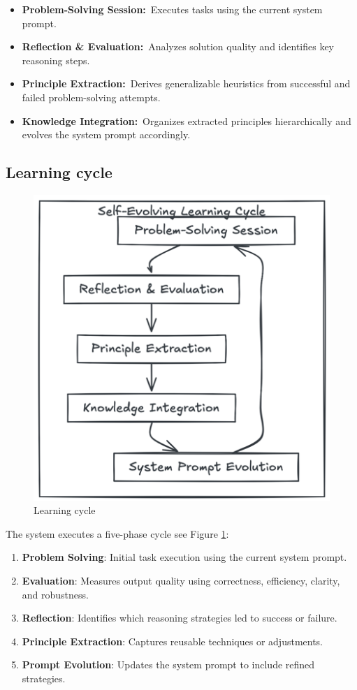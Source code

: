 \documentclass[10pt,a4paper,twocolumn]{article}
\begin{document}
\begin{itemize}
    \item \textbf{Problem-Solving Session:} Executes tasks using the current system prompt.
    \item \textbf{Reflection \& Evaluation:} Analyzes solution quality and identifies key reasoning steps.
    \item \textbf{Principle Extraction:} Derives generalizable heuristics from successful and failed problem-solving attempts.
    \item \textbf{Knowledge Integration:} Organizes extracted principles hierarchically and evolves the system prompt accordingly.
\end{itemize}



\subsection{Learning cycle}

\begin{figure}
    \centering
    \includegraphics[width=0.75\linewidth]{learning_cycle.png}
    \caption{Learning cycle}
    \label{fig:cycle}
\end{figure}


 The system executes a five-phase cycle see Figure \ref{fig:cycle}:

\begin{enumerate}
    \item \textbf{Problem Solving}: Initial task execution using the current system prompt.
    \item \textbf{Evaluation}: Measures output quality using correctness, efficiency, clarity, and robustness.
    \item \textbf{Reflection}: Identifies which reasoning strategies led to success or failure.
    \item \textbf{Principle Extraction}: Captures reusable techniques or adjustments.
    \item \textbf{Prompt Evolution}: Updates the system prompt to include refined strategies.
\end{enumerate}
\end{document}
